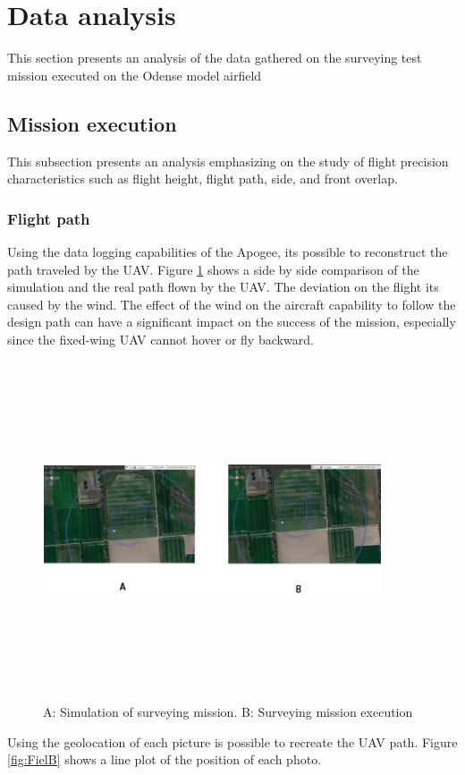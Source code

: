 \section{Data analysis}
This section presents an analysis of the data gathered on the surveying test mission executed on the Odense model airfield
\subsection{Mission execution}
This subsection presents an analysis emphasizing on the study of flight precision characteristics such as flight height, flight path, side, and front overlap. 
\subsubsection{Flight path}
Using the data logging capabilities of the Apogee, its possible to reconstruct the path traveled by the UAV.
Figure \ref{fig:SimVReal} shows a side by side comparison of the simulation and the real path flown by the UAV. The deviation on the flight its caused by the wind. The effect of the wind on the aircraft capability to follow the design path can have a significant impact on the success of the mission, especially since the fixed-wing UAV cannot hover or fly backward. 
\begin{figure}[H]
\centering
\includegraphics[width=10cm,height=10cm,keepaspectratio]{imagenes/SimVsreallity.png}
\caption{ A: Simulation of surveying mission. B: Surveying mission execution}
\label{fig:SimVReal}
\end{figure}
Using the geolocation of each picture is possible to recreate the UAV path. Figure \ref{fig:FielB} shows a line plot of the position of each photo.
